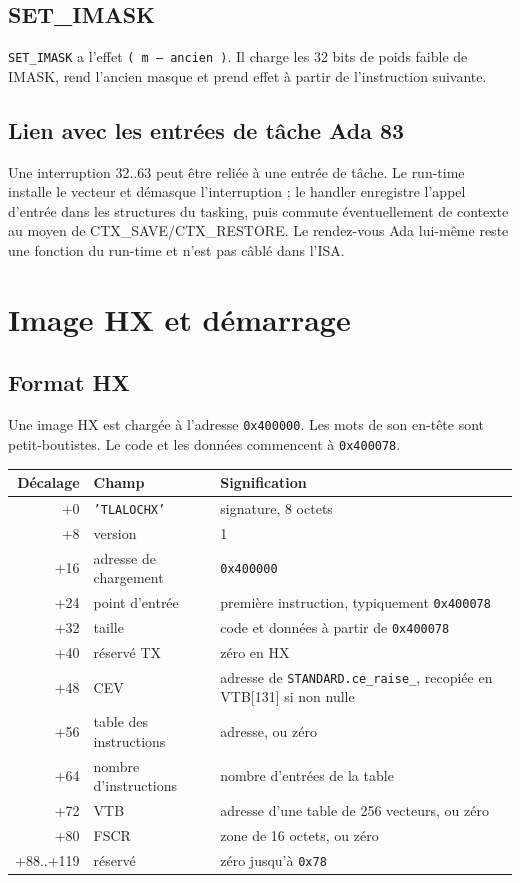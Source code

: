 \documentclass[10pt,a4paper,twoside,openany]{book}
\newcommand{\stack}[1]{\texttt{#1}}
\newcommand{\reg}[1]{\textsc{#1}}
\begin{document}
\section{SET\_IMASK}
\texttt{SET\_IMASK} a l'effet \stack{( m -- ancien )}. Il charge les 32 bits de poids faible de \reg{IMASK}, rend l'ancien masque et prend effet à partir de l'instruction suivante.

\section{Lien avec les entrées de tâche Ada 83}
Une interruption 32..63 peut être reliée à une entrée de tâche. Le run-time installe le vecteur et démasque l'interruption ; le handler enregistre l'appel d'entrée dans les structures du tasking, puis commute éventuellement de contexte au moyen de CTX\_SAVE/CTX\_RESTORE. Le rendez-vous Ada lui-même reste une fonction du run-time et n'est pas câblé dans l'ISA.

\chapter{Image HX et démarrage}
\section{Format HX}
Une image HX est chargée à l'adresse \texttt{0x400000}. Les mots de son en-tête sont petit-boutistes. Le code et les données commencent à \texttt{0x400078}.

\begin{center}
\begin{tabularx}{\linewidth}{@{}r l X@{}}
\toprule Décalage & Champ & Signification\\ \midrule
+0 & \texttt{'TLALOCHX'} & signature, 8 octets\\
+8 & version & 1\\
+16 & adresse de chargement & \texttt{0x400000}\\
+24 & point d'entrée & première instruction, typiquement \texttt{0x400078}\\
+32 & taille & code et données à partir de \texttt{0x400078}\\
+40 & réservé TX & zéro en HX\\
+48 & CEV & adresse de \texttt{STANDARD.ce\_raise\_}, recopiée en VTB[131] si non nulle\\
+56 & table des instructions & adresse, ou zéro\\
+64 & nombre d'instructions & nombre d'entrées de la table\\
+72 & VTB & adresse d'une table de 256 vecteurs, ou zéro\\
+80 & FSCR & zone de 16 octets, ou zéro\\
+88..+119 & réservé & zéro jusqu'à \texttt{0x78}\\
\bottomrule
\end{tabularx}
\end{center}
\end{document}
